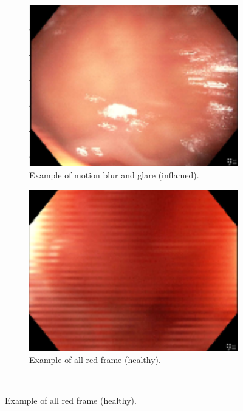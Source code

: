 \begin{figure}
	\centering
	\begin{subfigure}{0.4\linewidth}
		\centering
		\includegraphics[width=\linewidth]{Materials/Discussion/idx_1_frame_550}
		\caption{Example of motion blur and glare (inflamed).}
	\end{subfigure}
	\hspace{0.5cm}
	\begin{subfigure}{0.4\linewidth}
		\centering
		\includegraphics[width=\linewidth]{Materials/Discussion/idx_1_frame_1410}
		\caption{Example of all red frame (healthy).}
	\end{subfigure}
	\\

\end{figure}
